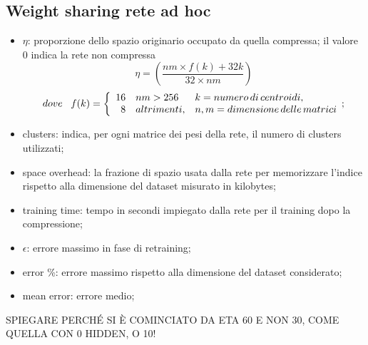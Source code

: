 \documentclass[12pt]{report}
\begin{document}
\subsection{Weight sharing rete ad hoc}
\begin{itemize}
\item{$\eta$}: proporzione dello spazio originario occupato da quella compressa; il valore 0 indica la rete non compressa $$\eta=\left(\frac{n m \times f(k) + 32k}{32 \times n m}\right)$$ 
\begin{multline}
$$dove \,\,\,\,\,
f(k) =
\bigg \{
\begin{array}{rl}
16 & nm > 256 \\
8 & altrimenti, \\
\end{array}
\begin{array}{ll}
k = numero\, di\, centroidi, \\
n, m = dimensione\, delle\, matrici
\end{array}
$$;
\end{multline}
\item{clusters}: indica, per ogni matrice dei pesi della rete, il numero di clusters utilizzati;
\item{space overhead}: la frazione di spazio usata dalla rete per memorizzare l'indice rispetto alla dimensione del dataset misurato in kilobytes;
\item{training time}: tempo in secondi impiegato dalla rete per il training dopo la compressione;
\item{$\epsilon$}: errore massimo in fase di retraining;
\item{error \%}: errore massimo rispetto alla dimensione del dataset considerato;
\item{mean error}: errore medio;
\end{itemize}
\par\null\par
\par\null\par

SPIEGARE PERCHÉ SI È COMINCIATO DA ETA 60 E NON 30, COME QUELLA CON 0 HIDDEN, O 10!


\end{document}
